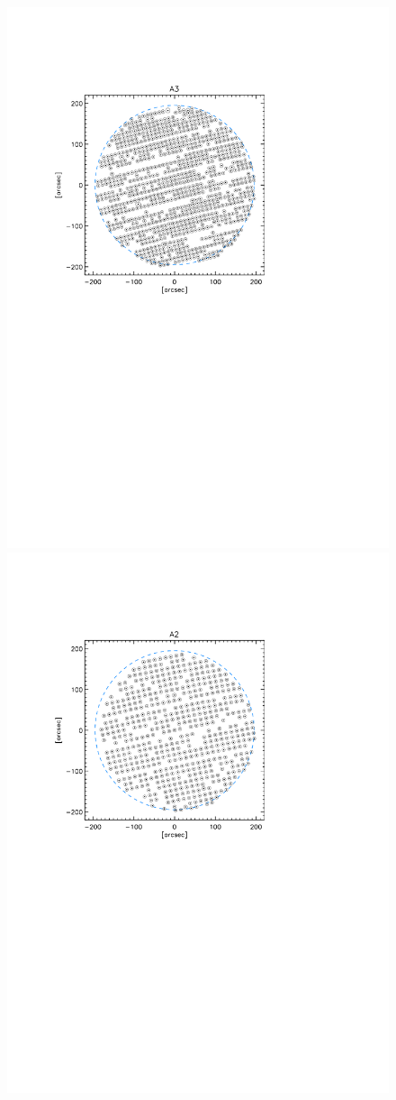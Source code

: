 \documentclass[]{aa} %
\begin{document}
\begin{figure}[h]
   \includegraphics[trim=2cm 12cm 4.6cm 4.3cm, clip=true,width=0.78\linewidth]{A3_fwhm_valid.pdf}
   \includegraphics[trim=2cm 12cm 4.6cm 4.3cm, clip=true,width=0.78\linewidth]{A2_fwhm_valid.pdf}       

\end{figure}
\end{document}
